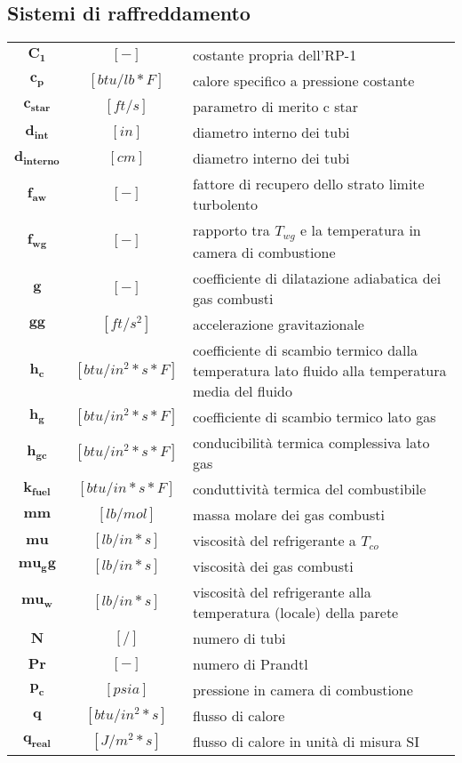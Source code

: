 \begin{multicols}{2}
	\subsection{Sistemi di raffreddamento}
	\begin{tabularx}{\linewidth}{ccX}
		$\bm{C_1}$ & $[-]$ & costante propria dell'RP-1 \\
		$\bm{c_p}$ & $[btu/lb*F]$ & calore specifico a pressione costante \\
		$\bm{c_{star}}$ & $[ft/s]$ &  parametro di merito c star \\
		$\bm{d_{int}}$ & $[in]$ &  diametro interno dei tubi \\
		$\bm{d_{interno}}$ & $[cm]$ &  diametro interno dei tubi \\
		$\bm{f_{aw}}$ & $[-]$ & fattore di recupero dello strato limite turbolento \\
		$\bm{f_{wg}}$ & $[-]$ & rapporto tra $T_{wg}$ e la temperatura in camera di combustione \\
		$\bm{g}$ & $[-]$ & coefficiente di dilatazione adiabatica dei gas combusti \\
		$\bm{gg}$ & $[ft/s^2]$ & accelerazione gravitazionale \\
		$\bm{h_c}$ & $[btu/in^2*s*F]$ & coefficiente di scambio termico dalla temperatura lato fluido alla temperatura media del fluido \\
		$\bm{h_g}$ & $[btu/in^2*s*F]$ & coefficiente di scambio termico lato gas \\
		$\bm{h_{gc}}$ & $[btu/in^2*s*F]$ & conducibilità termica complessiva lato gas \\
		$\bm{k_{fuel}}$ & $[btu/in*s*F]$ & conduttività termica del combustibile \\
		$\bm{mm}$ & $[lb/mol]$ & massa molare dei gas combusti \\
		$\bm{mu}$ & $[lb/in*s]$ & viscosità del refrigerante a $T_{co}$\\
		$\bm{mu_gg}$ & $[lb/in*s]$ & viscosità dei gas combusti\\
		$\bm{mu_w}$ & $[lb/in*s]$ & viscosità del refrigerante alla temperatura (locale) della parete \\
		$\bm{N}$ & $[/]$ & numero di tubi \\
		$\bm{Pr}$ & $[-]$ & numero di Prandtl \\
		$\bm{p_c}$ & $[psia]$ & pressione in camera di combustione \\
		$\bm{q}$ & $[btu/in^2*s]$ & flusso di calore \\
		$\bm{q_{real}}$ & $[J/m^2*s]$ & flusso di calore in unità di misura SI \\

\end{tabularx}
\end{multicols}
